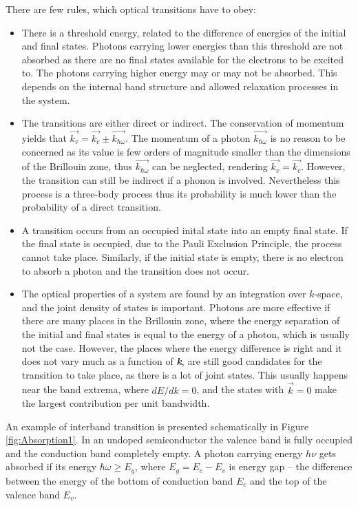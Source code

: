 \documentclass[titlepage,a4paper]{book}
\begin{document}
There are few rules, which optical transitions have to obey:
\begin{itemize}
\item There is a threshold energy, related to the difference of energies of the initial and final states. Photons carrying lower energies than this threshold are not absorbed as there are no final states available for the electrons to be excited to. The photons carrying higher energy may or may not be absorbed. This depends on the internal band structure and allowed relaxation processes in the system.
\item The transitions are either direct or indirect. The conservation of momentum yields that $\vec{k_v} = \vec{k_c} \pm \vec{k_{\hbar\omega}}$. The momentum of a photon $\vec{k_{\hbar\omega}}$ is no reason to be concerned as its value is few orders of magnitude smaller than the dimensions of the Brillouin zone, thus $\vec{k_{\hbar\omega}}$ can be neglected, rendering  $\vec{k_v} = \vec{k_c}$. However, the transition can still be indirect if a phonon is involved. Nevertheless this process is a three-body process thus its probability is much lower than the probability of a direct transition.
\item A transition occurs from an occupied inital state into an empty final state. If the final state is occupied, due to the Pauli Exclusion Principle, the process cannot take place. Similarly, if the initial state is empty, there is no electron to absorb a photon and the transition does not occur.
\item The optical properties of a system are found by an integration over $k$-space, and the joint density of states is important. Photons are more effective if there are many places in the Brillouin zone, where the energy separation of the initial and final states is equal to the energy of a photon, which is usually not the case. However, the places where the energy difference is right and it does not vary much as a function of \textbf{\textit{k}}, are still good candidates for the transition to take place, as there is a lot of joint states. This usually happens near the band extrema, where $dE/dk = 0$, and the states with $\vec{k} = 0$ make the largest contribution per unit bandwidth.  
\end{itemize}

An example of interband transition is presented schematically in Figure \ref{fig:Absorption1}. In an undoped semiconductor the valence band is fully occupied and the conduction band completely empty. A photon carrying energy $h\nu$ gets absorbed if its energy $\hbar\omega \geq E_g$, where $E_g = E_c - E_v$ is energy gap -- the difference between the energy of the bottom of conduction band $E_c$ and the top of the valence band $E_v$. 
\end{document}
